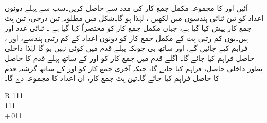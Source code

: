 آئیں  اور  کا مجموعہ مکمل جمع کار کی مدد سے حاصل کریں۔سب سے پہلے دونوں اعداد کو تین ثنائی ہندسوں میں لکھیں ، لہٰذا  ہو گا۔شکل  میں مطلوبہ تین درجی، تین بِٹ جمع کار پیش کیا گیا ہے، جہاں مکمل جمع کار کو مختصراً  کہا گیا ہے ۔ ثنائی عدد  اور  ہیں۔یوں کم رتبی بِٹ کے مکمل جمع کار کو دونوں اعداد کے کم رتبی ہندسے،  اور ، فراہم کیے جائیں گے، اور ساتھ ہی چونکہ پہلے قدم میں کوئی  نہیں ہو گا لہٰذا داخلی حاصل  فراہم کیا جائے گا۔ اگلے قدم میں جمع کار کو  اور  کے ساتھ پہلے قدم کا حاصل  بطور داخلی حاصل، فراہم کیا جائے گا، جبکہ آخری جمع کار کو  اور  کے ساتھ گزشتہ قدم کا حاصل  فراہم کیا جائے گا۔تین بِٹ جمع کار، ان اعداد کا مجموعہ  دے گا۔
 \begin{center}
 \begin{tabular}{R}
 111\phantom{1}\\
 111\\
 +\,011\\
 \end{tabular}
 \end{center}
